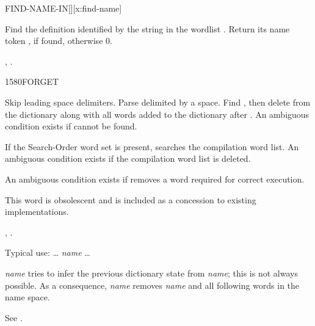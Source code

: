 \begin{worddef}{}{FIND-NAME-IN}[][x:find-name]
\item {}

Find the definition identified by the string  in the wordlist
.  Return its name token , if found, otherwise 0.

\see {},
	.

\begin{implement}
\end{implement}

\begin{testing}
\end{testing}
\end{worddef}

\begin{worddef}{1580}{FORGET}
\item {}

	Skip leading space delimiters. Parse  delimited by a
	space. Find , then delete  from the
	dictionary along with all words added to the dictionary after
	. An ambiguous condition exists if  cannot
	be found.

	If the Search-Order word set is present,  searches
	the compilation word list. An ambiguous condition exists if the
	compilation word list is deleted.

	An ambiguous condition exists if  removes a word
	required for correct execution.

\note This word is obsolescent and is included as a concession to
	existing implementations.

\see {},
	.

	\begin{rationale} %
		Typical use:
			{\ldots}  \emph{name} {\ldots}

		 \emph{name} tries to infer the previous dictionary
		state from \emph{name}; this is not always possible.  As a
		consequence,  \emph{name} removes \emph{name} and
		all following words in the name space.

		See .
	\end{rationale}
\end{worddef}

